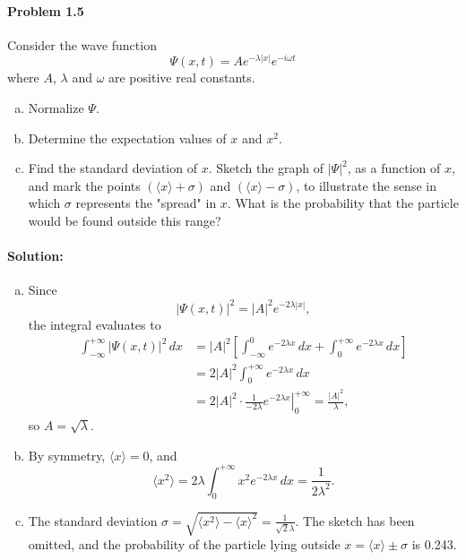 \documentclass{article}
\begin{document}
\paragraph{Problem 1.5} Consider the wave function \[ \Psi(x, t) =
Ae^{-\lambda|x|}e^{-i\omega t} \] where $A$, $\lambda$ and $\omega$ are
positive real constants.
\begin{enumerate}[(a)]
  \item Normalize $\Psi$.
  \item Determine the expectation values of $x$ and $x^2$.
  \item Find the standard deviation of $x$. Sketch the graph of $|\Psi|^2$, as
    a function of $x$, and mark the points $(\langle x \rangle + \sigma)$ and
    $(\langle x \rangle - \sigma)$, to illustrate the sense in which $\sigma$
    represents the "spread" in $x$. What is the probability that the particle
    would be found outside this range?
\end{enumerate}

\paragraph{Solution:}
\begin{enumerate}[(a)]
  \item Since \[ |\Psi(x, t)|^2 = |A|^2e^{-2\lambda|x|}, \] the integral
    evaluates to
    \begin{align*}
      \int_{-\infty}^{+\infty} |\Psi(x, t)|^2 \,dx
      &= |A|^2\left[
        \int_{-\infty}^0 e^{-2\lambda x} \,dx +
        \int_0^{+\infty} e^{-2\lambda x} \,dx
      \right] \\
      &= 2|A|^2\int_0^{+\infty} e^{-2\lambda x} \,dx \\
      &= 2|A|^2 \cdot \left.
        \frac{1}{-2\lambda}e^{-2\lambda x}
      \right|_0^{+\infty} = \frac{|A|^2}{\lambda},
    \end{align*}
    so $A = \sqrt{\lambda}$.
  \item By symmetry, $\langle x \rangle = 0$, and
    \begin{equation*}
      \langle x^2 \rangle = 2\lambda\int_0^{+\infty} x^2e^{-2\lambda x}
      \,dx = \frac{1}{2\lambda^2}.
    \end{equation*}
  \item The standard deviation $\sigma = \sqrt{\langle x^2 \rangle -
    \langle x \rangle^2} = \frac{1}{\sqrt{2}\lambda}$. The sketch has been
    omitted, and the probability of the particle lying outside $x =
    \langle x \rangle \pm \sigma$ is 0.243.
\end{enumerate}
\end{document}

